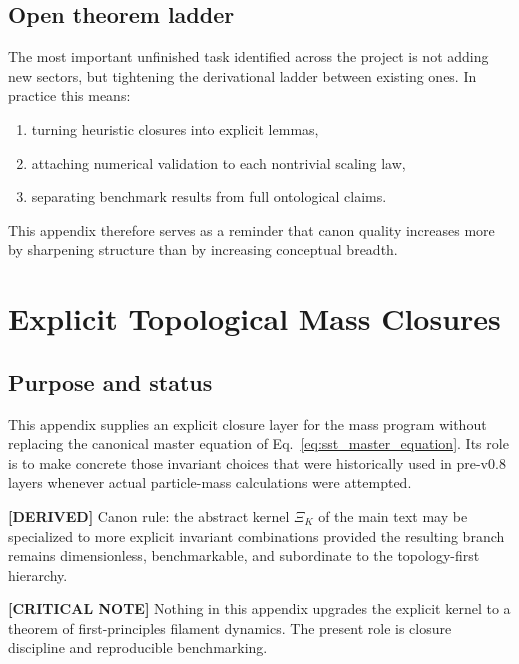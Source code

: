 \documentclass[11pt]{article}
\theoremstyle{definition}
\theoremstyle{plain}
\theoremstyle{remark}
\begin{document}
        \subsection{Open theorem ladder}
            The most important unfinished task identified across the project is not adding new sectors, but tightening the derivational ladder between existing ones. In practice this means:
            \begin{enumerate}
                \item turning heuristic closures into explicit lemmas,
                \item attaching numerical validation to each nontrivial scaling law,
                \item separating benchmark results from full ontological claims.
            \end{enumerate}
            This appendix therefore serves as a reminder that canon quality increases more by sharpening structure than by increasing conceptual breadth.

 
        \newpage
    
    
    \section{Explicit Topological Mass Closures}
    \label{sec:appendix_explicit_mass}
    
    \subsection{Purpose and status}
        This appendix supplies an explicit closure layer for the mass program without replacing the canonical master equation of Eq.~\eqref{eq:sst_master_equation}. Its role is to make concrete those invariant choices that were historically used in pre-v0.8 layers whenever actual particle-mass calculations were attempted.
        
        \textbf{[DERIVED]} Canon rule: the abstract kernel \(\Xi_K\) of the main text may be specialized to more explicit invariant combinations provided the resulting branch remains dimensionless, benchmarkable, and subordinate to the topology-first hierarchy.
        
        \textbf{[CRITICAL NOTE]} Nothing in this appendix upgrades the explicit kernel to a theorem of first-principles filament dynamics. The present role is closure discipline and reproducible benchmarking.
    
\end{document}
